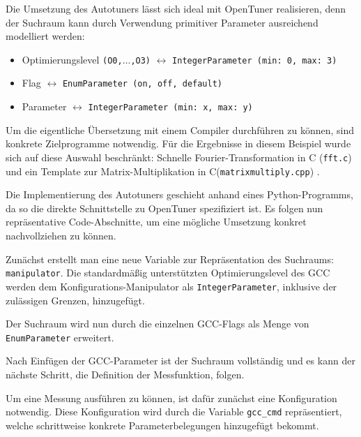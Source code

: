 \documentclass[a4paper,11pt]{scrartcl}
\def\CC{{C\nolinebreak[4]\hspace{-.05em}\raisebox{.4ex}{\tiny\bf ++}}}
\begin{document}
Die Umsetzung des Autotuners lässt sich ideal mit OpenTuner realisieren, denn der
Suchraum kann durch Verwendung primitiver Parameter ausreichend modelliert werden:
\begin{itemize}
  \item Optimierungslevel \texttt{(O0,$\ldots$,O3)} $\leftrightarrow$ \texttt{IntegerParameter~(min:~0, max:~3)}
  \item Flag $\leftrightarrow$ \texttt{EnumParameter~(on,~off,~default)}
  \item Parameter $\leftrightarrow$ \texttt{IntegerParameter~(min:~x, max:~y)}
\end{itemize}
Um die eigentliche Übersetzung mit einem Compiler durchführen zu können, sind konkrete
Zielprogramme notwendig. Für die Ergebnisse in diesem Beispiel wurde sich auf diese
Auswahl beschränkt: Schnelle Fourier-Transformation in C (\texttt{fft.c}) \cite{fftc} und 
ein Template zur Matrix-Multiplikation in \CC (\texttt{matrixmultiply.cpp}) \cite{mmcpp}. \newline

Die Implementierung des Autotuners geschieht anhand eines Python-Programms, da so die direkte Schnittstelle
zu OpenTuner spezifiziert ist. Es folgen nun repräsentative Code-Abschnitte, um eine
mögliche Umsetzung konkret nachvollziehen zu können.  \newline


Zunächst erstellt man eine neue Variable zur Repräsentation des Suchraums: \texttt{manipulator}.
Die standardmäßig unterstützten Optimierungslevel des GCC werden dem Konfigurations-Manipulator
als \texttt{IntegerParameter}, inklusive der zulässigen Grenzen, hinzugefügt. \newline


Der Suchraum wird nun durch die einzelnen GCC-Flags als Menge von \texttt{EnumParameter} 
erweitert. \newline


Nach Einfügen der GCC-Parameter ist der Suchraum vollständig und es kann der nächste Schritt,
die Definition der Messfunktion, folgen. \newline


Um eine Messung ausführen zu können, ist dafür zunächst eine Konfiguration notwendig.
Diese Konfiguration wird durch die Variable \texttt{gcc\_cmd} repräsentiert, welche
schrittweise konkrete Parameterbelegungen hinzugefügt bekommt. \newline
\end{document}
